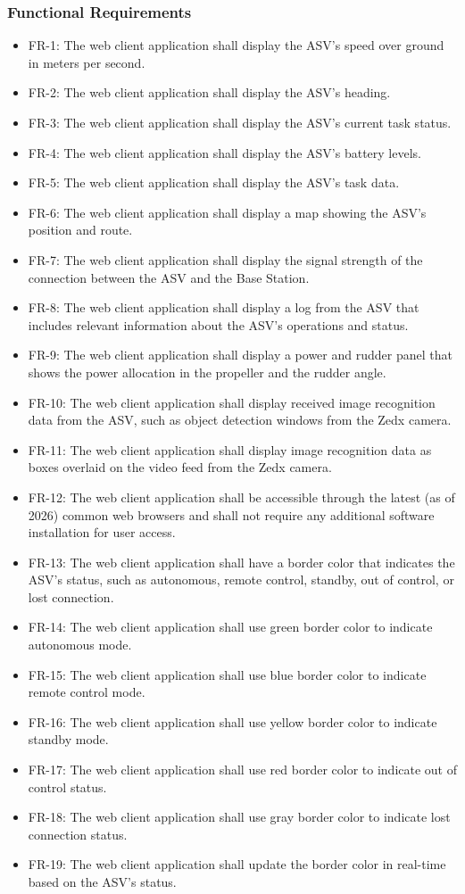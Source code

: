\subsubsection{Functional Requirements}
\begin{itemize}
    \item FR-1: The web client application shall display the ASV's speed over ground in meters per second.
    \item FR-2: The web client application shall display the ASV's heading.
    \item FR-3: The web client application shall display the ASV's current task status.
    \item FR-4: The web client application shall display the ASV's battery levels.
    \item FR-5: The web client application shall display the ASV's task data.
    \item FR-6: The web client application shall display a map showing the ASV's position and route.
    \item FR-7: The web client application shall display the signal strength of the connection between the ASV and the Base Station.
    \item FR-8: The web client application shall display a log from the ASV that includes relevant information about the ASV's operations and status.
    \item FR-9: The web client application shall display a power and rudder panel that shows the power allocation in the propeller and the rudder angle.
    \item FR-10: The web client application shall display received image recognition data from the ASV, such as object detection windows from the Zedx camera.
    \item FR-11: The web client application shall display image recognition data as boxes overlaid on the video feed from the Zedx camera.
    \item FR-12: The web client application shall be accessible through the latest (as of 2026) common web browsers and shall not require any additional software installation for user access.
    \item FR-13: The web client application shall have a border color that indicates the ASV's status, such as autonomous, remote control, standby, out of control, or lost connection.
    \item FR-14: The web client application shall use green border color to indicate autonomous mode.
    \item FR-15: The web client application shall use blue border color to indicate remote control mode.
    \item FR-16: The web client application shall use yellow border color to indicate standby mode.
    \item FR-17: The web client application shall use red border color to indicate out of control status.
    \item FR-18: The web client application shall use gray border color to indicate lost connection status.
    \item FR-19: The web client application shall update the border color in real-time based on the ASV's status.
\end{itemize}

